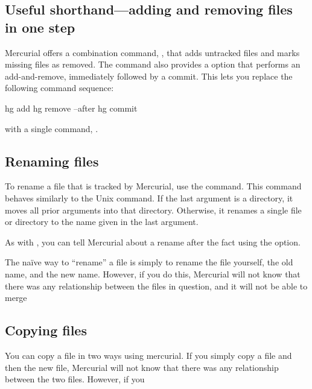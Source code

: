 \subsection{Useful shorthand---adding and removing files in one step}

Mercurial offers a combination command, , that adds
untracked files and marks missing files as removed.  The
 command also provides a  option that
performs an add-and-remove, immediately followed by a commit.  This
lets you replace the following command sequence:
\begin{codesample2}
  hg add
  hg remove --after
  hg commit
\end{codesample2}
with a single command, .

\subsection{Renaming files}

To rename a file that is tracked by Mercurial, use the 
command.  This command behaves similarly to the Unix 
command.  If the last argument is a directory, it moves all prior
arguments into that directory.  Otherwise, it renames a single file or
directory to the name given in the last argument.

As with , you can tell Mercurial about a rename after
the fact using the  option.

The na\"{i}ve way to ``rename'' a file is simply to rename the file
yourself,  the old name, and  the new name.
However, if you do this, Mercurial will not know that there was any
relationship between the files in question, and it will not be able to
merge

\subsection{Copying files}

You can copy a file in two ways using mercurial.  If you simply copy a
file and then  the new file, Mercurial will not know that
there was any relationship between the two files.  However, if you 

